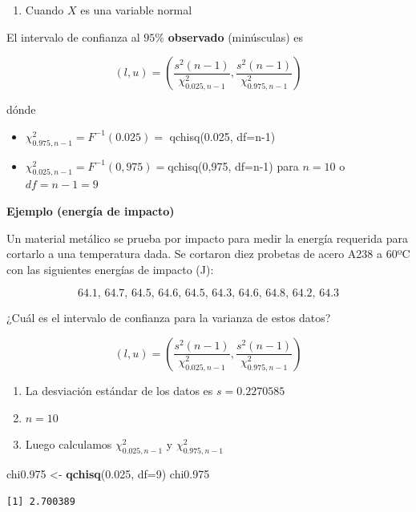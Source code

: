 \documentclass[
]{book}
\newenvironment{Shaded}{\begin{snugshade}}{\end{snugshade}}
\newcommand{\AttributeTok}[1]{\textcolor[rgb]{0.13,0.29,0.53}{#1}}
\newcommand{\DecValTok}[1]{\textcolor[rgb]{0.00,0.00,0.81}{#1}}
\newcommand{\FloatTok}[1]{\textcolor[rgb]{0.00,0.00,0.81}{#1}}
\newcommand{\FunctionTok}[1]{\textcolor[rgb]{0.13,0.29,0.53}{\textbf{#1}}}
\newcommand{\NormalTok}[1]{#1}
\newcommand{\OtherTok}[1]{\textcolor[rgb]{0.56,0.35,0.01}{#1}}
\providecommand{\tightlist}{%
  \setlength{\itemsep}{0pt}\setlength{\parskip}{0pt}}
\begin{document}
\begin{enumerate}
\def\labelenumi{\arabic{enumi}.}
\tightlist
\item
  Cuando \(X\) es una variable normal
\end{enumerate}

El intervalo de confianza al \(95\%\) \textbf{observado} (minúsculas) es

\[(l,u) = (\frac{s^2 (n-1)}{\chi^2_{0.025,n-1}},\frac{s^2(n-1)}{\chi ^2_{0.975,n-1}})\]

dónde

\begin{itemize}
\item
  \(\chi^2_{0.975,n-1}=F^{-1}(0.025)=\) qchisq(0.025, df=n-1)
\item
  \(\chi^2_{0.025, n-1}=F^{-1}(0,975)=\)qchisq(0,975, df=n-1)
  para \(n=10\) o \(df=n-1=9\)
\end{itemize}

\textbf{Ejemplo (energía de impacto)}

Un material metálico se prueba por impacto para medir la energía requerida para cortarlo a una temperatura dada. Se cortaron diez probetas de acero A238 a 60ºC con las siguientes energías de impacto (J):

\[64.1,\, 64.7,\, 64.5,\, 64.6,\, 64.5,\, 64.3,\, 64.6,\, 64.8,\, 64.2,\, 64.3\]

¿Cuál es el intervalo de confianza para la varianza de estos datos?

\[(l,u) = (\frac{s^2 (n-1)}{\chi^2_{0.025,n-1}},\frac{s^2(n-1)}{\chi ^2_{0.975,n-1}})\]

\begin{enumerate}
\def\labelenumi{\arabic{enumi}.}
\item
  La desviación estándar de los datos es \(s=0.2270585\)
\item
  \(n=10\)
\item
  Luego calculamos \(\chi^2_{0.025,n-1}\) y \(\chi^2_{0.975,n-1}\)
\end{enumerate}

\begin{Shaded}
\begin{Highlighting}[]
\NormalTok{chi0}\FloatTok{.975} \OtherTok{\textless{}{-}} \FunctionTok{qchisq}\NormalTok{(}\FloatTok{0.025}\NormalTok{, }\AttributeTok{df=}\DecValTok{9}\NormalTok{)}
\NormalTok{chi0}\FloatTok{.975}
\end{Highlighting}
\end{Shaded}

\begin{verbatim}
[1] 2.700389
\end{verbatim}
\end{document}
